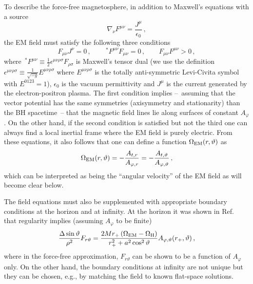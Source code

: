 \documentclass[11pt]{article}
\newcommand{\be}{\begin{equation}}
\newcommand{\ee}{\end{equation}}
\numberwithin{equation}{section} %
\begin{document}
To describe the force-free magnetosphere, in addition to Maxwell's equations with a source 
%
\be\label{maxwell_source}
\nabla_{\nu}F^{\mu\nu}=\frac{J^{\mu}}{\epsilon_0}\,,
\ee
% 
the EM field must satisfy the following three conditions
%
\be\label{force_free}
F_{\mu\nu}J^{\nu}=0\,,\qquad
\,^{\ast}F^{\mu\nu}F_{\mu\nu}=0\,,\qquad
F_{\mu\nu}F^{\mu\nu}>0\,,
\ee
%
where $\,^{\ast}F^{\mu\nu} \equiv \frac{1}{2}\epsilon^{\mu\nu\rho\sigma}F_{\rho\sigma}$ is Maxwell's tensor dual (we use 
the definition $\epsilon^{\mu\nu\rho\sigma}\equiv
\frac{1}{\sqrt{-g}}E^{\mu\nu\rho\sigma}$ where $E^{\mu\nu\rho\sigma}$ is the totally anti-symmetric Levi-Civita symbol 
with $E^{0123}=1$), $\epsilon_0$ is the vacuum permittivity and $J^{\mu}$ is the current generated by the 
electron-positron plasma. The first condition implies --~assuming that the vector potential has the same symmetries 
(axisymmetry and stationarity) than the BH spacetime~-- that the magnetic field lines lie along surfaces of constant 
$A_{\varphi}$. On the other hand, if the second condition is satisfied but not the third one can always find a local 
inertial frame where the EM field is purely electric.
From these equations, it also follows that one can define a function $\Omega_{\rm EM}(r,\vartheta)$ as
%
\be
\Omega_{\rm EM}(r,\vartheta)=-\frac{A_{t,r}}{A_{\varphi,r}}=-\frac{A_{t,\vartheta}}{A_{\varphi,\vartheta}}\,, 
\label{omegaBZ}
\ee
%
which can be interpreted as being the ``angular velocity'' of the EM field as will become clear below.

The field equations must also be supplemented with appropriate boundary conditions at the horizon and at infinity. At 
the horizon it was shown in Ref.~\cite{1977MNRAS.179..457Z} that regularity implies (assuming $A_{\varphi}$ to be 
finite) 
%
\be
\frac{\Delta\sin\vartheta}{\rho^2}F_{r\vartheta}=\frac{2M r_+\left(\Omega_{\rm EM}-\Omega_{\rm 
H}\right)}{r_+^2+a^2\cos^2\vartheta}A_{\varphi,\vartheta}(r_+,\vartheta)\,,
\ee
%
where in the force-free approximation, $F_{r\vartheta}$ can be shown to be a function of $A_{\varphi}$ only. On the 
other hand, the boundary conditions at infinity are not unique but they can be chosen, e.g., by matching the field to 
known flat-space solutions.

\end{document}
